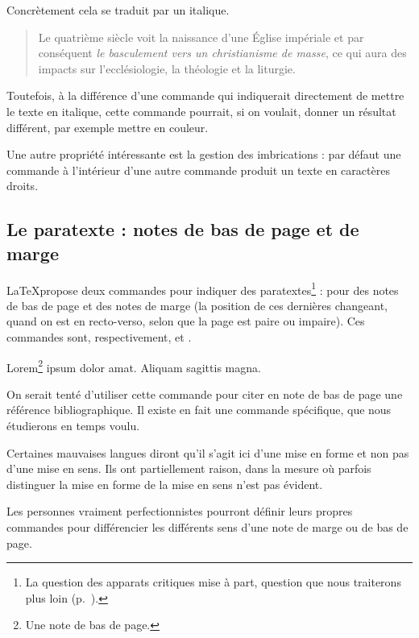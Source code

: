 Concrètement cela se traduit par un italique. 

\begin{quotation}
Le quatrième siècle voit la naissance d'une Église impériale et par conséquent \emph{le basculement vers un christianisme de masse}, ce qui aura des impacts sur l'ecclésiologie, la théologie et la liturgie.
\end{quotation}

Toutefois, à la différence d'une commande qui indiquerait directement de mettre le texte en italique, cette commande pourrait, si on voulait, donner un résultat différent, par exemple mettre en couleur. 

Une autre propriété intéressante est la gestion des imbrications : par défaut une commande  à l'intérieur d'une autre commande  produit un texte en caractères droits.

\subsection{Le paratexte : notes de bas de page et de marge}

\LaTeX propose deux commandes pour indiquer des paratextes\footnote{La question des apparats critiques mise à part, question que nous traiterons plus loin (p.~\pageref{ledmac}).} : pour des notes de bas de page et des notes de marge (la position de ces dernières changeant, quand on est en recto-verso, selon que la page est paire ou impaire). Ces commandes sont, respectivement,  et .

\begin{latexcode}
Lorem\footnote{Une note de bas de page.} ipsum dolor amat.
Aliquam sagittis magna.
\end{latexcode}

\begin{attention}
    On serait tenté d'utiliser cette commande pour citer en note de bas de page une référence bibliographique. Il existe en fait une commande spécifique, que nous étudierons en temps voulu.
\end{attention}
\begin{attention}
    Certaines mauvaises langues diront qu'il s'agit ici d'une mise en forme et non pas d'une mise en sens. Ils ont partiellement raison, dans la mesure où parfois distinguer la mise en forme de la mise en sens n'est pas évident.
    
    Les personnes vraiment perfectionnistes pourront définir leurs propres commandes pour différencier les différents sens d'une note de marge ou de bas de page.
\end{attention}

